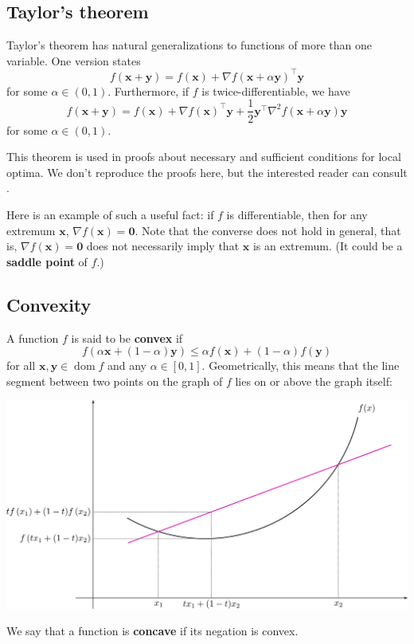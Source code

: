 \documentclass{article}
\DeclareMathOperator*{\dom}{dom}
\renewcommand{\vec}[1]{\mathbf{#1}}
\newcommand{\tran}{^\top}
\newcommand{\term}[1]{\textbf{#1}}
\begin{document}
\subsection{Taylor's theorem}
Taylor's theorem has natural generalizations to functions of more than one variable. One version states
\[f(\vec{x} + \vec{y}) = f(\vec{x}) + \nabla f(\vec{x} + \alpha\vec{y})\tran\vec{y}\]
for some $\alpha \in (0,1)$. Furthermore, if $f$ is twice-differentiable, we have
\[f(\vec{x} + \vec{y}) = f(\vec{x}) + \nabla f(\vec{x})\tran\vec{y} + \frac{1}{2}\vec{y}\tran\nabla^2f(\vec{x}+\alpha\vec{y})\vec{y}\]
for some $\alpha \in (0,1)$.

This theorem is used in proofs about necessary and sufficient conditions for local optima. We don't reproduce the proofs here, but the interested reader can consult \cite{numopt}.

Here is an example of such a useful fact: if $f$ is differentiable, then for any extremum $\vec{x}$, $\nabla f(\vec{x}) = \vec{0}$. Note that the converse does not hold in general, that is, $\nabla f(\vec{x}) = \vec{0}$ does not necessarily imply that $\vec{x}$ is an extremum. (It could be a \term{saddle point} of $f$.)

\subsection{Convexity}
A function $f$ is said to be \term{convex} if
\[f(\alpha\vec{x} + (1-\alpha)\vec{y}) \leq \alpha f(\vec{x}) + (1-\alpha)f(\vec{y})\]
for all $\vec{x}, \vec{y} \in \dom f$ and any $\alpha \in [0,1]$. Geometrically, this means that the line segment between two points on the graph of $f$ lies on or above the graph itself:
\begin{center}
\includegraphics[width=0.9\linewidth]{convex}
\end{center}
We say that a function is \term{concave} if its negation is convex.
\end{document}
